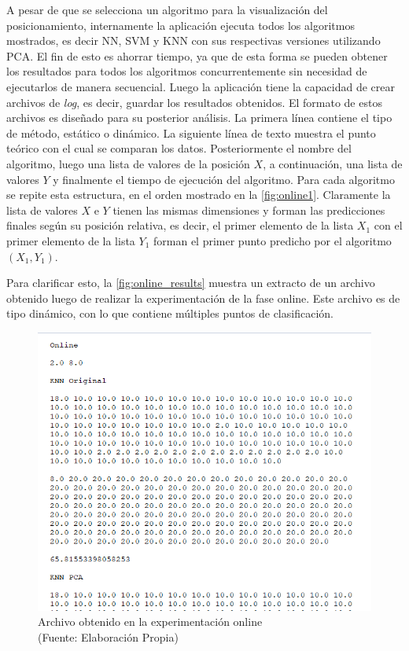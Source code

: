 A pesar de que se selecciona un algoritmo para la visualización del posicionamiento, internamente la aplicación ejecuta todos los algoritmos mostrados, es decir NN, SVM y KNN con sus respectivas versiones utilizando PCA. El fin de esto es ahorrar tiempo, ya que de esta forma se pueden obtener los resultados para todos los algoritmos concurrentemente sin necesidad de ejecutarlos de manera secuencial. Luego la aplicación tiene la capacidad de crear archivos de \textit{log}, es decir, guardar los resultados obtenidos. El formato de estos archivos es diseñado para su posterior análisis. La primera línea contiene el tipo de método, estático o dinámico. La siguiente línea de texto muestra el punto teórico con el cual se comparan los datos. Posteriormente el nombre del algoritmo, luego una lista de valores de la posición $X$, a continuación, una lista de valores $Y$ y finalmente el tiempo de ejecución del algoritmo. Para cada algoritmo se repite esta estructura, en el orden mostrado en la \autoref{fig:online1}. Claramente la lista de valores $X$ e $Y$ tienen las mismas dimensiones y forman las predicciones finales según su posición relativa, es decir, el primer elemento de la lista $X_{1}$ con el primer elemento de la lista $Y_{1}$ forman el primer punto predicho por el algoritmo $(X_{1}, Y_{1})$. 

Para clarificar esto, la \autoref{fig:online_results} muestra un extracto de un archivo obtenido luego de realizar la experimentación de la fase online. Este archivo es de tipo dinámico, con lo que contiene múltiples puntos de clasificación.

\begin{figure}[ht!]
\centering
\includegraphics[width=.6\textwidth]{figures/online-results.png}
\caption[Archivo obtenido en la experimentación online]{Archivo obtenido en la experimentación online  \\
{\scriptsize (Fuente: Elaboración Propia)}}
\label{fig:online_results}
\end{figure}



